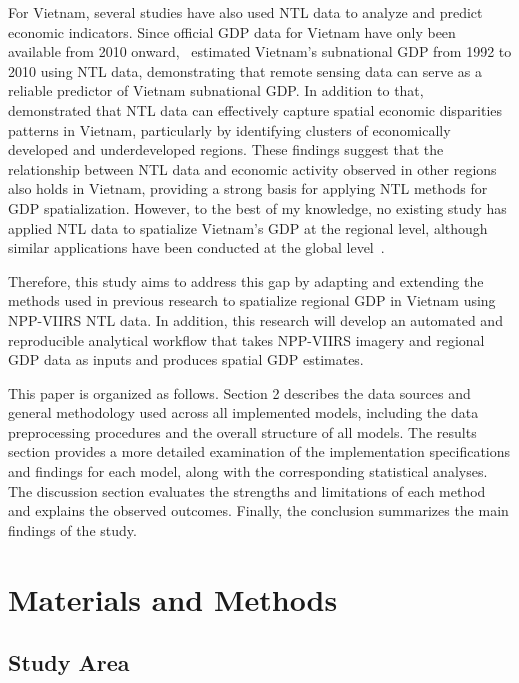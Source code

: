 \documentclass[11pt]{article} %
\begin{document}
For Vietnam, several studies have also used NTL data to analyze and predict economic indicators. Since official GDP data for Vietnam have only been available from 2010 onward,~\textcite{sul-ngu-men:VN-GDP-NTL-ML} estimated Vietnam's subnational GDP from 1992 to 2010 using NTL data, demonstrating that remote sensing data can serve as a reliable predictor of Vietnam subnational GDP. In addition to that,~\textcite{zha:VN-GDP-disparities} demonstrated that NTL data can effectively capture spatial economic disparities patterns in Vietnam, particularly by identifying clusters of economically developed and underdeveloped regions. These findings suggest that the relationship between NTL data and economic activity observed in other regions also holds in Vietnam, providing a strong basis for applying NTL methods for GDP spatialization. However, to the best of my knowledge, no existing study has applied NTL data to spatialize Vietnam's GDP at the regional level, although similar applications have been conducted at the global level~\parencite{wan-sut-qi:Global-GDP-VIIRS}.

Therefore, this study aims to address this gap by adapting and extending the methods used in previous research to spatialize regional GDP in Vietnam using NPP-VIIRS NTL data. In addition, this research will develop an automated and reproducible analytical workflow that takes NPP-VIIRS imagery and regional GDP data as inputs and produces spatial GDP estimates.

This paper is organized as follows. Section 2 describes the data sources and general methodology used across all implemented models, including the data preprocessing procedures and the overall structure of all models. The results section provides a more detailed examination of the implementation specifications and findings for each model, along with the corresponding statistical analyses. The discussion section evaluates the strengths and limitations of each method and explains the observed outcomes. Finally, the conclusion summarizes the main findings of the study.

\section{Materials and Methods}

\subsection{Study Area}
\end{document}
